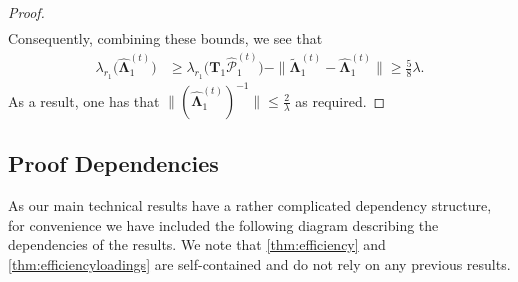 \documentclass[10pt]{article}
\newcommand{\0}{{\mathbf{0}}}
\newcommand{\1}{{\mathbf{1}}}
\newcommand{\inv}{^{-1}}
\renewcommand{\tilde}{\widetilde}
\renewcommand{\hat}{\widehat}
\renewcommand{\hat}{\widehat}
\begin{document}
{\begin{proof}
\begin{align*}
\end{align*}
Consequently, combining these bounds, we see that
\begin{align*}
 \lambda_{r_1}\big( \mathbf{\hat \Lambda}_1^{(t)} \big) &\geq \lambda_{r_1}\big(\mathbf{T}_1 \mathcal{\hat P}_1^{(t)} \big) - \|  \mathbf{\tilde \Lambda}_1^{(t)} - \mathbf{\hat \Lambda}_1^{(t)} \| \geq \frac{5}{8} \lambda.
\end{align*}
As a result, one has that $\|(\mathbf{\hat \Lambda}_1^{(t)})\inv\| \leq \frac{2}{\lambda}$ as required.  
\end{proof}
 }

 
 \subsection{Proof Dependencies}
As our main technical results have a rather complicated dependency structure, for convenience we have included the following diagram describing the dependencies of the results.  We note that \cref{thm:efficiency} and \cref{thm:efficiencyloadings} are self-contained and do not rely on any previous results.  
\end{document}
